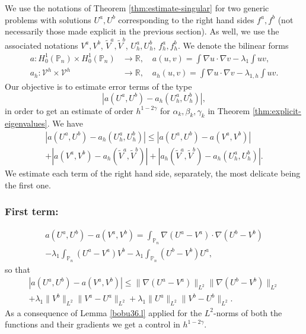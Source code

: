 \documentclass[11pt]{article}
\newcommand{\Subsubsection}{\subsubsection}
\numberwithin{equation}{section}\newtheorem*{jepEnonce}{\jepEnonceTitle}\newenvironment{enonce*}[1]{\def\jepEnonceTitle{#1}\jepEnonce}{\endjepEnonce}\newtheorem*{conj*}{Conjecture}
\theoremstyle{plain}
\theoremstyle{definition}
\newcommand{\aaa}{a}
\newcommand{\bbb}{b}
\let\Bbb\mathbb
\def\R{\mathbb{R}}
\def\Pp{{\mathbb{P}_n}}
\newcommand{\lb}{\lambda}
\begin{document}
We use the notations of Theorem \ref{thm:estimate-singular} for two generic problems with solutions $U^\aaa, U^\bbb$ corresponding to the right hand sides $f^\aaa, f^\bbb$ (not necessarily those made explicit in the previous section). As well, we use the associated notations $V^\aaa, V^\bbb$, $\tilde V^\aaa, \tilde V^\bbb$, $U_h^\aaa, U_h^\bbb$, $f_h^\aaa, f_h^\bbb$. We denote the bilinear forms\vspace*{-3pt}
\begin{align*}
a: H^1_0(\Bbb P_n) \times H^1_0(\Bbb P_n) &\to \R,\quad a(u,v)= \int \nabla u \cdot \nabla v -\lb_1 \int uv,\\
a_h: {\mathcal V}^h \times{\mathcal V}^h &\to \R, \quad a_h(u,v)= \int \nabla u \cdot \nabla v -\lb_{1,h} \int uv.
\end{align*}
Our objective is to estimate error terms of the type\vspace*{-3pt}
\[
|a(U^\aaa,U^\bbb)-a_h(U_h^\aaa, U_h^\bbb)|,
\]
in order to get an estimate of order $h^{1-2\gamma}$ for $\alpha_k,\beta_k,\gamma_k$ in Theorem \ref{thm:explicit-eigenvalues}.
We have\vspace*{-3pt}
\begin{multline}
\label{eq:estimate-a(U,V)}
|a(U^\aaa,U^\bbb)-a_h(U_h^\aaa, U_h^\bbb)|
\le
|a(U^\aaa,U^\bbb)-a(V^\aaa, V^\bbb)|\\
+ |a(V^\aaa,V^\bbb)-a_h(\tilde V^\aaa, \tilde V^\bbb)|+ |a_h(\tilde V^\aaa, \tilde V^\bbb)-a_h(U_h^\aaa, U_h^\bbb)|.
\end{multline}
We estimate each term of the right hand side, separately, the most delicate being the first one.

\Subsubsection*{First term:}\vspace*{-1.8\baselineskip}
\begin{multline*}
a(U^a,U^b)-a(V^a, V^b)= \int_\Pp \nabla (U^a-V^a)\cdot \nabla (U^\bbb-V^\bbb) \\[-8pt]
- \lb_1 \int_\Pp (U^\aaa-V^\aaa) V^\bbb- \lb_1 \int_\Pp (U^\bbb-V^\bbb) U^\aaa,
\end{multline*}
so that\vspace*{-5pt}
\begin{multline*}
|a(U^\aaa,U^\bbb)-a(V^\aaa, V^\bbb)|
\leq \| \nabla (U^\aaa-V^\aaa)\|_{L^2} \| \nabla (U^\bbb-V^\bbb)\|_{L^2}\\
+ \lb_1\|V^\bbb\|_{L^2} \|V^\aaa-U^\aaa\|_{L^2}+ \lb_1\|U^\aaa\|_{L^2} \|V^\bbb-U^\bbb\|_{L^2}.\end{multline*}
As a consequence of Lemma \ref{bobu36.l} applied for the $L^2$-norms of both the functions and their gradients we get a control in $h^{1-2\gamma}$.
\end{document}
